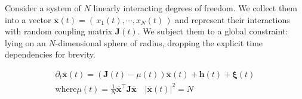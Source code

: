 Consider a system of $N$ linearly interacting degrees of freedom. We collect them into a vector $\mathbf{\bar x}(t) = \left(\,x_1(t),\cdots, x_N(t)\,\right)$ and represent their interactions with random coupling matrix $\mathbf{J}(t)$. We subject them to a global constraint: lying on an $N$-dimensional sphere of radius, dropping the explicit time dependencies for brevity.

\begin{align}
\partial_t\mathbf{\bar x}(t) = (\mathbf{J}(t)-\mu(t))\mathbf{\bar x}(t)+\mathbf{h}(t)+\boldsymbol\xi(t) \\
\mathrm{where}\mu(t)=\frac{1}{N}\mathbf{\bar x}^{\top}\mathbf{J}\mathbf{\bar x}\quad|\mathbf{\bar x}(t)|^2=N
\end{align}